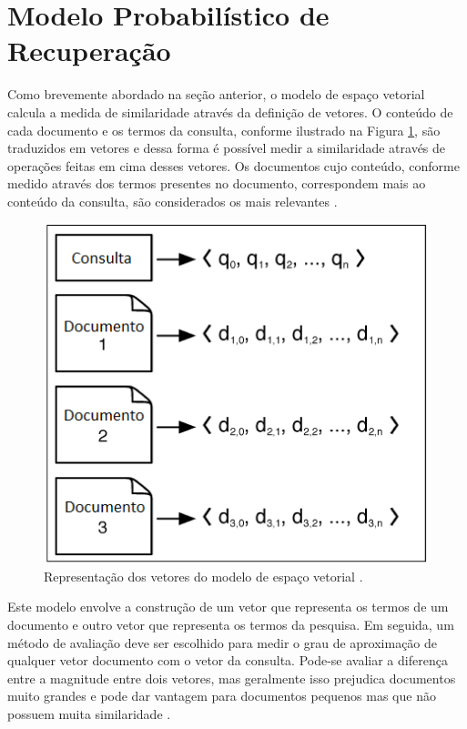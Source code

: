 \section{Modelo Probabilístico de Recuperação}

Como brevemente abordado na seção anterior, o modelo de espaço vetorial calcula a medida de similaridade através da definição de vetores. O conteúdo de cada documento e os termos da consulta, conforme ilustrado na Figura \ref{fig:documento-vetor}, são traduzidos em vetores e dessa forma é possível medir a similaridade através de operações feitas em cima desses vetores. Os documentos cujo conteúdo, conforme medido através dos termos presentes no documento, correspondem mais ao conteúdo da consulta, são considerados os mais relevantes \citep{Grossman2004}.

\begin{figure}[htb]
	\centering
	\includegraphics[scale=1.0]{chapters/informationretrieval/Document_as_Vectors.png}
	\caption{Representação dos vetores do modelo de espaço vetorial \citep{Grossman2004}.}
	\label{fig:documento-vetor}
\end{figure}

Este modelo envolve a construção de um vetor que representa os termos de um documento e outro vetor que representa os termos da pesquisa. Em seguida, um método de avaliação deve ser escolhido para medir o grau de aproximação de qualquer vetor documento com o vetor da consulta. Pode-se avaliar a diferença entre a magnitude entre dois vetores, mas geralmente isso prejudica documentos muito grandes e pode dar vantagem para documentos pequenos mas que não possuem muita similaridade \citep{Croft2010}.

